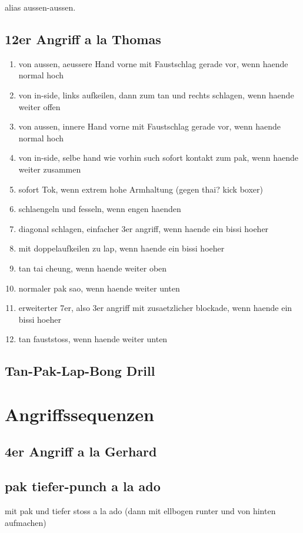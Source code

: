alias aussen-aussen.

\subsection{12er Angriff a la Thomas}

\begin{enumerate}
	\item von aussen, aeussere Hand vorne mit Faustschlag gerade vor, wenn haende normal hoch
	\item von in-side, links aufkeilen, dann zum tan und rechts schlagen, wenn haende weiter offen
	\item von aussen, innere Hand vorne mit Faustschlag gerade vor, wenn haende normal hoch
	\item von in-side, selbe hand wie vorhin such sofort kontakt zum pak, wenn haende weiter zusammen
	\item sofort Tok, wenn extrem hohe Armhaltung (gegen thai? kick boxer)
	\item schlaengeln und fesseln, wenn engen haenden
	\item diagonal schlagen, einfacher 3er angriff, wenn haende ein bissi hoeher
	\item mit doppelaufkeilen zu lap, wenn haende ein bissi hoeher
	\item tan tai cheung, wenn haende weiter oben
	\item normaler pak sao, wenn haende weiter unten
	\item erweiterter 7er, also 3er angriff mit zusaetzlicher blockade, wenn haende ein bissi hoeher
	\item tan fauststoss, wenn haende weiter unten
\end{enumerate}

\subsection{Tan-Pak-Lap-Bong Drill}


\section{Angriffssequenzen}

\subsection{4er Angriff a la Gerhard}

\subsection{pak tiefer-punch a la ado}
mit pak und tiefer stoss a la ado (dann mit ellbogen runter und von hinten aufmachen)

